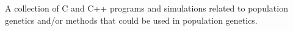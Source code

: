 A collection of C and C++ programs and simulations related to population genetics and/or methods that could be used in population genetics. 